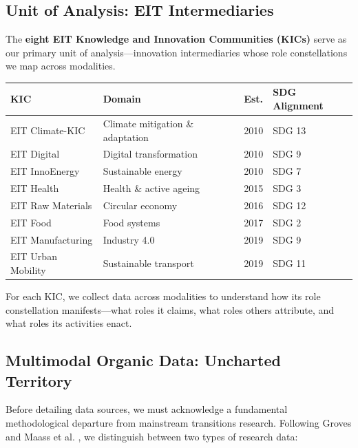 \documentclass[../main.tex]{subfiles}
\begin{document}
\subsection{Unit of Analysis: EIT Intermediaries}

The \textbf{eight EIT Knowledge and Innovation Communities (KICs)} serve as our primary unit of analysis---innovation intermediaries whose role constellations we map across modalities.

\begin{center}
\small
\begin{tabular}{@{}llcl@{}}
\toprule
\textbf{KIC} & \textbf{Domain} & \textbf{Est.} & \textbf{SDG Alignment} \\
\midrule
EIT Climate-KIC & Climate mitigation \& adaptation & 2010 & SDG 13 \\
EIT Digital & Digital transformation & 2010 & SDG 9 \\
EIT InnoEnergy & Sustainable energy & 2010 & SDG 7 \\
EIT Health & Health \& active ageing & 2015 & SDG 3 \\
EIT Raw Materials & Circular economy & 2016 & SDG 12 \\
EIT Food & Food systems & 2017 & SDG 2 \\
EIT Manufacturing & Industry 4.0 & 2019 & SDG 9 \\
EIT Urban Mobility & Sustainable transport & 2019 & SDG 11 \\
\bottomrule
\end{tabular}
\end{center}

For each KIC, we collect data across modalities to understand how its role constellation manifests---what roles it claims, what roles others attribute, and what roles its activities enact.

\subsection{Multimodal Organic Data: Uncharted Territory}

Before detailing data sources, we must acknowledge a fundamental methodological departure from mainstream transitions research. Following Groves \citeyear{groves2011three} and Maass et al. \citeyear{maass2018data}, we distinguish between two types of research data:
\end{document}

